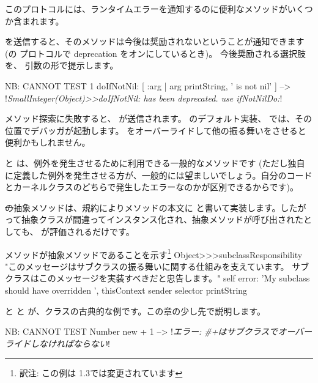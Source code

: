 \documentclass[a4paper,10pt,twoside]{book}
\begin{document}
このプロトコルには、ランタイムエラーを通知するのに便利なメソッドがいくつか含まれます。

 を送信すると、そのメソッドは今後は奨励されないということが通知できます(の  プロトコルで deprecation をオンにしているとき)。
今後奨励される選択肢を、 引数の形で提示します。

\begin{code}{NB: CANNOT TEST}
1 doIfNotNil: [ :arg | arg printString, ' is not nil' ]
  --> !\emph{SmallInteger(Object)>>doIfNotNil: has been deprecated. use ifNotNilDo:}!
\end{code}

メソッド探索に失敗すると、 が送信されます。 のデフォルト実装、\ie{} では、その位置でデバッガが起動します。 をオーバーライドして他の振る舞いをさせると便利かもしれません。


 と  は、例外を発生させるために利用できる一般的なメソッドです
(ただし独自に定義した例外を発生させる方が、一般的には望ましいでしょう。自分のコードとカーネルクラスのどちらで発生したエラーなのかが区別できるからです)。

\st の抽象メソッドは、規約によりメソッドの本文に  と書いて実装します。したがって抽象クラスが間違ってインスタンス化され、抽象メソッドが呼び出されたとしても、 が評価されるだけです。

\begin{method}{メソッドが抽象メソッドであることを示す\protect\footnote{訳注: この例は \pharo 1.3では変更されています}}
Object>>>subclassResponsibility
    "このメッセージはサブクラスの振る舞いに関する仕組みを支えています。
    サブクラスはこのメッセージを実装すべきだと忠告します。"
    self error: 'My subclass should have overridden ', thisContext sender selector printString
\end{method}

 と  と  が、クラスの古典的な例です。この章の少し先で説明します。

\begin{code}{NB: CANNOT TEST}
Number new + 1 --> !\emph{エラー: \#+はサブクラスでオーバーライドしなければならない}!
\end{code}
\end{document}
